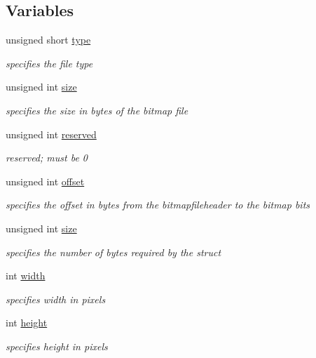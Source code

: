 \subsection*{Variables}
\begin{DoxyCompactItemize}
\item 
unsigned short \hyperlink{group___bitmap_gaa929142c5ddf34cf0915c97a617a1a63}{type}
\begin{DoxyCompactList}\small\item\em specifies the file type \end{DoxyCompactList}\item 
unsigned int \hyperlink{group___bitmap_gaac913b3a1f6ef005d66bf7a84428773e}{size}
\begin{DoxyCompactList}\small\item\em specifies the size in bytes of the bitmap file \end{DoxyCompactList}\item 
unsigned int \hyperlink{group___bitmap_ga05d5cbcb44f437341bd9fa37d589aced}{reserved}
\begin{DoxyCompactList}\small\item\em reserved; must be 0 \end{DoxyCompactList}\item 
unsigned int \hyperlink{group___bitmap_ga29b5297d3393519050e3126c4cb07c1c}{offset}
\begin{DoxyCompactList}\small\item\em specifies the offset in bytes from the bitmapfileheader to the bitmap bits \end{DoxyCompactList}\item 
unsigned int \hyperlink{group___bitmap_gaac913b3a1f6ef005d66bf7a84428773e}{size}
\begin{DoxyCompactList}\small\item\em specifies the number of bytes required by the struct \end{DoxyCompactList}\item 
int \hyperlink{group___bitmap_ga2474a5474cbff19523a51eb1de01cda4}{width}
\begin{DoxyCompactList}\small\item\em specifies width in pixels \end{DoxyCompactList}\item 
int \hyperlink{group___bitmap_gad12fc34ce789bce6c8a05d8a17138534}{height}
\begin{DoxyCompactList}\small\item\em specifies height in pixels \end{DoxyCompactList}\item 

\end{DoxyCompactItemize}
